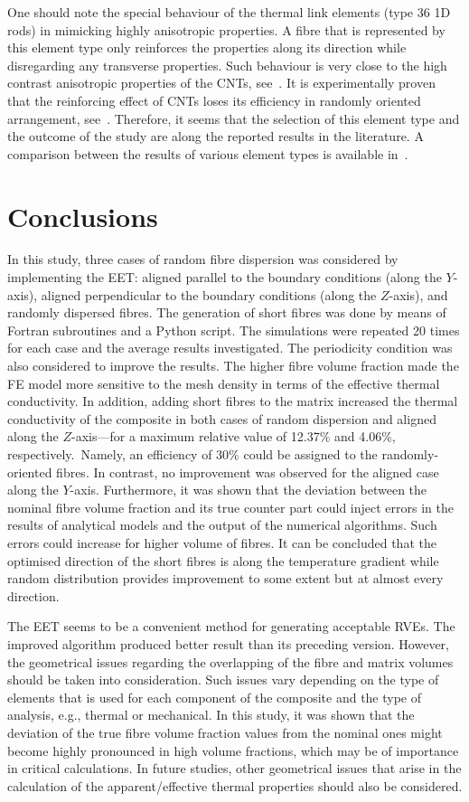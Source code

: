 	One should note the special behaviour of the thermal link elements (type 36 1D rods) in mimicking highly anisotropic properties. A fibre that is represented by this element type only reinforces the properties along its direction while disregarding any transverse properties. Such behaviour is very close to the high contrast anisotropic properties of the CNTs, see~\autocite{Savvas.2016}. It is experimentally proven that the reinforcing effect of CNTs loses its efficiency in randomly oriented arrangement, see~\autocite{Savvas.2016b}. Therefore, it seems that the selection of this element type and the outcome of the study are along the reported results in the literature. A comparison between the results of various element types is available in~\autocite{Yuan.2014}.
\bl

\section{Conclusions}
In this study, three cases of random fibre dispersion was considered by implementing the EET: aligned parallel to the boundary conditions (along the $Y$-axis), aligned perpendicular to the boundary conditions (along the $Z$-axis), and randomly dispersed fibres. The generation of short fibres was done by means of Fortran subroutines and a Python script. The simulations were repeated 20 times for each case and the average results investigated. The periodicity condition was also considered to improve the results. The higher fibre volume fraction made the FE model more sensitive to the mesh density in terms of the effective thermal conductivity. In addition, adding short fibres to the matrix increased the thermal conductivity of the composite in both cases of random dispersion and aligned along the $Z$-axis---for a maximum relative value of 12.37\% and 4.06\%, respectively.\red\ Namely, an efficiency of 30\% could be assigned to the randomly-oriented fibres. In contrast, no improvement was observed for the aligned case along the $Y$-axis. Furthermore, it was shown that the deviation between the nominal fibre volume fraction and its true counter part could inject errors in the results of analytical models and the output of the numerical algorithms. Such errors could increase for higher volume of fibres. It can be concluded that the optimised direction of the short fibres is along the temperature gradient while random distribution provides improvement to some extent but at almost every direction. 

The EET seems to be a convenient method for generating acceptable RVEs. The improved algorithm produced better result than its preceding version. However, the geometrical issues regarding the overlapping of the fibre and matrix volumes should be taken into consideration. Such issues vary depending on the type of elements that is used for each component of the composite and the type of analysis, e.g., thermal or mechanical. In this study, it was shown that the deviation of the true fibre volume fraction values from the nominal ones might become highly pronounced in high volume fractions, which may be of importance in critical calculations. In future studies, other geometrical issues that arise in the calculation of the apparent/effective thermal properties should also be considered.\bl

